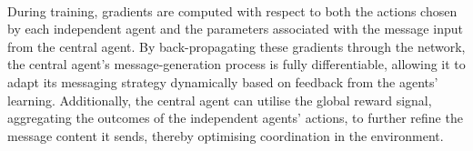 \documentclass{article}
\begin{document}
\

During training, gradients are computed with respect to both the actions chosen by each independent agent and the parameters associated with the message input from the central agent. By back-propagating these gradients through the network, the central agent’s message-generation process is fully differentiable, allowing it to adapt its messaging strategy dynamically based on feedback from the agents’ learning. Additionally, the central agent can utilise the global reward signal, aggregating the outcomes of the independent agents' actions, to further refine the message content it sends, thereby optimising coordination in the environment.
\end{document}
